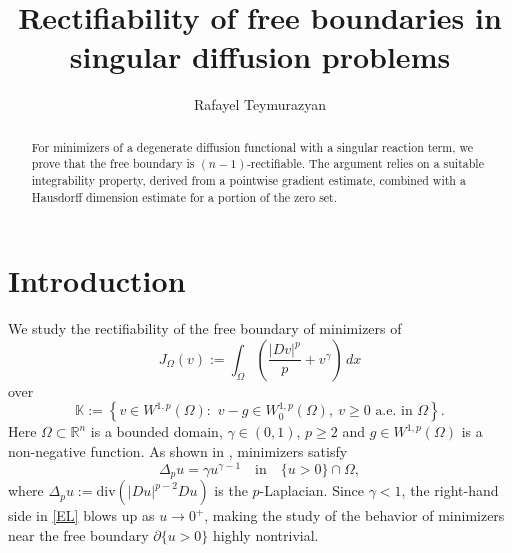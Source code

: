 \documentclass[11pt, reqno]{amsart}
\date{}
\numberwithin{equation}{section}
\numberwithin{theorem}{section}
\numberwithin{lemma}{section}
\numberwithin{corollary}{section}
\numberwithin{remark}{section}
\numberwithin{proposition}{section}
\numberwithin{definition}{section}
\newcommand{\R}{\mathbb{R}}
\begin{document}





\title[Rectifiability of free boundaries]{Rectifiability of free boundaries in singular diffusion problems}

\author[R. Teymurazyan]{Rafayel Teymurazyan}
	\address{Applied Mathematics and Computational Sciences Program (AMCS), Computer, Electrical and Mathematical Sciences and Engineering Division (CEMSE), King Abdullah University of Science and Technology (KAUST), Thuwal, 23955-6900, Kingdom of Saudi Arabia}{}

\begin{abstract}
For minimizers of a degenerate diffusion functional with a singular reaction term, we prove that the free boundary is $(n-1)$-rectifiable. The argument relies on a suitable integrability property, derived from a pointwise gradient estimate, combined with a Hausdorff dimension estimate for a portion of the zero set.
\end{abstract}

\maketitle

\section{Introduction}
We study the rectifiability of the free boundary of minimizers of
\begin{equation}\label{mimization functional}
J_\Omega(v):=\int_{\Omega}\left(\frac{|Dv|^p}{p} + v^\gamma \right)\,dx
\end{equation}
over
\begin{equation}\label{minimization set}
    \mathbb{K}:=\left\{v\in W^{1,p}(\Omega):\,\,v-g\in W^{1,p}_0(\Omega), \ v\geq 0 \mbox{ a.e. in } \Omega\right\}.
\end{equation}
Here $\Omega\subset\R^n$ is a bounded domain, $\gamma\in(0,1)$, $p\ge2$ and $g\in W^{1,p}(\Omega)$ is a non-negative function. As shown in \cite[Proposition 2.1]{ATU25}, minimizers satisfy
\begin{equation}\label{EL}
\Delta_p u = \gamma u^{\gamma-1}
\quad\text{in}\quad\{u>0\}\cap\Omega,
\end{equation}
where $\Delta_p u:=\mathrm{div}(|Du|^{p-2}Du)$ is the $p$-Laplacian. Since $\gamma<1$, the right-hand side in \eqref{EL} blows up as $u\to0^+$, making the study of the behavior of minimizers near the free boundary $\partial\{u>0\}$ highly nontrivial.
\end{document}
